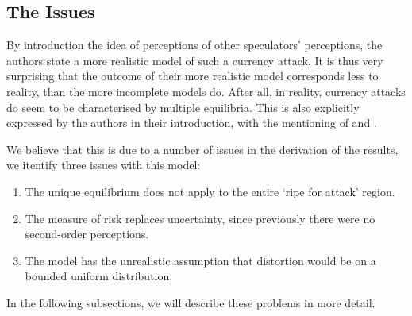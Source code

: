 \begin{refsection}
\section{The Issues}
\label{unc:issues}
By introduction the idea of perceptions of other speculators' perceptions,
the authors state a more realistic model of such a currency attack.
It is thus very surprising that the outcome of their more realistic model
corresponds less to reality, than the more incomplete models do.
After all, in reality, currency attacks do seem to be characterised by multiple equilibria.
This is also explicitly expressed by the authors in their introduction, with the mentioning of \textcite{eichengreen1993unstable} and \textcite{dornbusch1994mexico}.

We believe that this is due to a number of issues in the derivation of the results,
we itentify three issues with this model:
\begin{enumerate}
	\item The unique equilibrium does not apply to the entire `ripe for attack' region.
	\item The measure of risk replaces uncertainty, since previously there were no second-order perceptions.
	\item The model has the unrealistic assumption that distortion would be on a bounded uniform distribution.
\end{enumerate}
In the following subsections, we will describe these problems in more detail.


\end{refsection}
